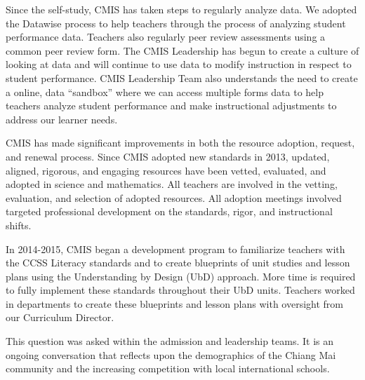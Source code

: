 Since the self-study, CMIS has taken steps to regularly analyze data. We adopted the Datawise process to help teachers through the process of analyzing student performance data. Teachers also regularly peer review assessments using a common peer review form. The CMIS Leadership has begun to create a culture of looking at data and will continue to use data to modify instruction in respect to student performance. CMIS Leadership Team also understands the need to create a online, data “sandbox” where we can access multiple forms data to help teachers analyze student performance and make instructional adjustments to address our learner needs.

CMIS has made significant improvements in both the resource adoption, request, and renewal process. Since CMIS adopted new standards in 2013, updated, aligned, rigorous, and engaging resources have been vetted, evaluated, and adopted in science and mathematics. All teachers are involved in the vetting, evaluation, and selection of adopted resources. All adoption meetings involved targeted professional development on the standards, rigor, and instructional shifts. 

In 2014-2015, CMIS began a development program to familiarize teachers with the CCSS Literacy standards and to create blueprints of unit studies and lesson plans using the Understanding by Design (UbD) approach. More time is required to fully implement these standards throughout their UbD units. Teachers worked in departments to create these blueprints and lesson plans with oversight from our Curriculum Director.  


This question was asked within the admission and leadership teams. It is an ongoing conversation that reflects upon the demographics of the Chiang Mai community and the increasing competition with local international schools. 
